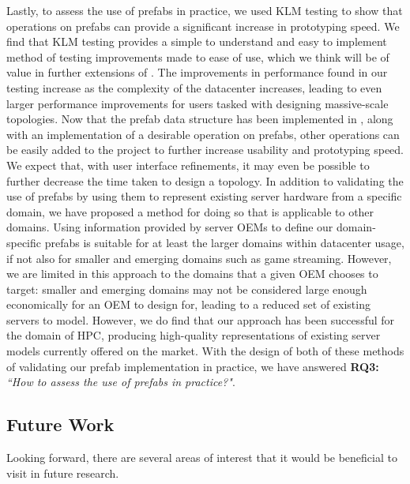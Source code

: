 \documentclass[11pt]{article}
\begin{document}
		Lastly, to assess the use of prefabs in practice, we used KLM testing to show that operations on prefabs can provide a significant increase in prototyping speed.
		We find that KLM testing provides a simple to understand and easy to implement method of testing improvements made to ease of use, which we think will be of value in further extensions of \opendc{}.
		The improvements in performance found in our testing increase as the complexity of the datacenter increases, leading to even larger performance improvements for users tasked with designing massive-scale topologies.
		Now that the prefab data structure has been implemented in \opendc{}, along with an implementation of a desirable operation on prefabs, other operations can be easily added to the project to further increase usability and prototyping speed.
		We expect that, with user interface refinements, it may even be possible to further decrease the time taken to design a topology.
		In addition to validating the use of prefabs by using them to represent existing server hardware from a specific domain, we have proposed a method for doing so that is applicable to other domains.
		Using information provided by server OEMs to define our domain-specific prefabs is suitable for at least the larger domains within datacenter usage, if not also for smaller and emerging domains such as game streaming.
		However, we are limited in this approach to the domains that a given OEM chooses to target: smaller and emerging domains may not be considered large enough economically for an OEM to design for, leading to a reduced set of existing servers to model.
		However, we do find that our approach has been successful for the domain of HPC, producing high-quality representations of existing server models currently offered on the market.
		With the design of both of these methods of validating our prefab implementation in practice, we have answered \textbf{RQ3:} \textit{``How to assess the use of prefabs in practice?"}.

	\subsection{Future Work} \label{sec:future-work}
		Looking forward, there are several areas of interest that it would be beneficial to visit in future research.
\end{document}
